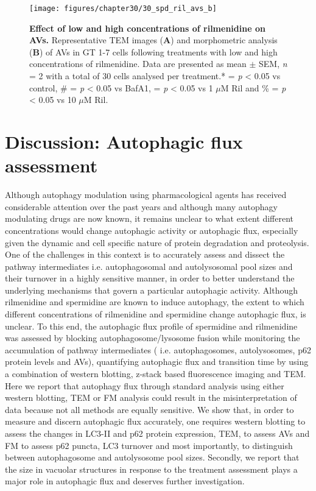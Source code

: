 {\begin{landscape}
\begin{figure}[!htbp]
\center
  \texttt{[image: figures/chapter30/30\_spd\_ril\_avs\_b]}
  \caption[Effect of low and high concentrations of rilmenidine on AVs]{\textbf{Effect of low and high concentrations of rilmenidine on AVs.} Representative TEM images (\textbf{A}) and morphometric analysis (\textbf{B}) of AVs in GT 1-7 cells following treatments with low and high concentrations of rilmenidine. Data are presented as mean $\pm$ SEM, \textit{n} = 2 with a total of 30 cells analysed per treatment.* = \textit{p} < 0.05 vs control, \# = \textit{p} < 0.05 vs BafA1, \@ = \textit{p} < 0.05 vs 1 $\mu$M Ril and  \% = \textit{p} < 0.05 vs 10 $\mu$M Ril.}
  \label{fig:30_spd_ril_avs_b}
\end{figure} 
\end{landscape}

\section{Discussion: Autophagic flux assessment}
Although autophagy modulation using pharmacological agents has received considerable attention over the past years and although many autophagy modulating drugs are now known, it remains unclear to what extent different concentrations would change autophagic activity or autophagic flux, especially given the dynamic and cell specific nature of protein degradation and proteolysis. One of the challenges in this context is to accurately assess and dissect the pathway intermediates i.e. autophagosomal and autolysosomal pool sizes and their turnover in a highly sensitive manner, in order to better understand the underlying mechanisms that govern a particular autophagic activity. Although rilmenidine and spermidine are known to induce autophagy, the extent to which different concentrations of rilmenidine and spermidine  change  autophagic flux, is unclear. To this end, the autophagic flux profile of spermidine and rilmenidine was assessed by blocking autophagosome/lysosome fusion while monitoring the accumulation of pathway intermediates ( i.e. autophagosomes, autolysosomes, p62 protein levels and AVs), quantifying autophagic flux and transition time by using a combination of western blotting, z-stack based fluorescence imaging and TEM. Here we report that autophagy flux through standard analysis using either western blotting, TEM or FM analysis could result in the misinterpretation of data because not all methods are equally sensitive. We show that, in order to measure and discern autophagic flux accurately, one requires western blotting to assess the changes in LC3-II and p62 protein expression, TEM, to assess AVs and FM to assess p62 puncta, LC3 turnover and most importantly, to distinguish between autophagosome and autolysosome pool sizes. Secondly, we report that the size in vacuolar structures in response to the treatment assessment plays a major role in autophagic flux and deserves further investigation.

}
